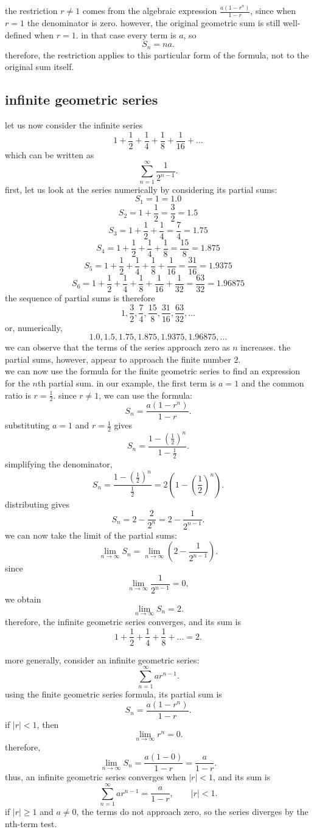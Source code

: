 \documentclass{article}
\begin{document}
the restriction $r\neq1$ comes from the algebraic expression $\frac{a(1-r^n)}{1-r}$, since when $r=1$ the denominator is zero. however, the original geometric sum is still well-defined when $r=1$. in that case every term is $a$, so
\[
\boxed{S_n=na.}
\]
therefore, the restriction applies to this particular form of the formula, not to the original sum itself.\\

\subsection{infinite geometric series}

let us now consider the infinite series
\[
1+\frac12+\frac14+\frac18+\frac1{16}+\ldots
\]
which can be written as
\[
\sum_{n=1}^{\infty}\frac{1}{2^{n-1}}.
\]
first, let us look at the series numerically by considering its partial sums:
\[
S_1=1=1.0
\]
\[
S_2=1+\frac12=\frac32=1.5
\]
\[
S_3=1+\frac12+\frac14=\frac74=1.75
\]
\[
S_4=1+\frac12+\frac14+\frac18=\frac{15}{8}=1.875
\]
\[
S_5=1+\frac12+\frac14+\frac18+\frac1{16}
=\frac{31}{16}=1.9375
\]
\[
S_6=1+\frac12+\frac14+\frac18+\frac1{16}+\frac1{32}
=\frac{63}{32}=1.96875
\]
the sequence of partial sums is therefore
\[
1,\frac32,\frac74,\frac{15}{8},\frac{31}{16},\frac{63}{32},\ldots
\]
or, numerically,
\[
1.0,1.5,1.75,1.875,1.9375,1.96875,\ldots
\]
we can observe that the terms of the series approach zero as $n$ increases. the partial sums, however, appear to approach the finite number $2$.\\

we can now use the formula for the finite geometric series to find an expression for the $n$th partial sum. in our example, the first term is $a=1$ and the common ratio is $r=\frac12$. since $r\neq1$, we can use the formula:
\[
S_n=\frac{a(1-r^n)}{1-r}.
\]
substituting $a=1$ and $r=\frac12$ gives
\[
S_n
=
\frac{1-\left(\frac12\right)^n}{1-\frac12}.
\]
simplifying the denominator,
\[
S_n
=
\frac{1-\left(\frac12\right)^n}{\frac12}
=
2\left(1-\left(\frac12\right)^n\right).
\]
distributing gives
\[
S_n=2-\frac{2}{2^n}
=2-\frac{1}{2^{n-1}}.
\]
we can now take the limit of the partial sums:
\[
\lim_{n\to\infty}S_n
=
\lim_{n\to\infty}
\left(2-\frac{1}{2^{n-1}}\right).
\]
since
\[
\lim_{n\to\infty}\frac{1}{2^{n-1}}=0,
\]
we obtain
\[
\lim_{n\to\infty}S_n=2.
\]
therefore, the infinite geometric series converges, and its sum is
\[
\boxed{
1+\frac12+\frac14+\frac18+\ldots=2.
}
\]

more generally, consider an infinite geometric series:
\[
\sum_{n=1}^{\infty}ar^{n-1}.
\]
using the finite geometric series formula, its partial sum is
\[
S_n=\frac{a(1-r^n)}{1-r}.
\]
if $|r|<1$, then
\[
\lim_{n\to\infty}r^n=0.
\]
therefore,
\[
\lim_{n\to\infty}S_n
=
\frac{a(1-0)}{1-r}
=
\frac{a}{1-r}.
\]
thus, an infinite geometric series converges when $|r|<1$, and its sum is
\[
\boxed{
\sum_{n=1}^{\infty}ar^{n-1}
=
\frac{a}{1-r},
\qquad |r|<1.
}
\]
if $|r|\geq1$ and $a\neq0$, the terms do not approach zero, so the series diverges by the nth-term test.\\
\end{document}
